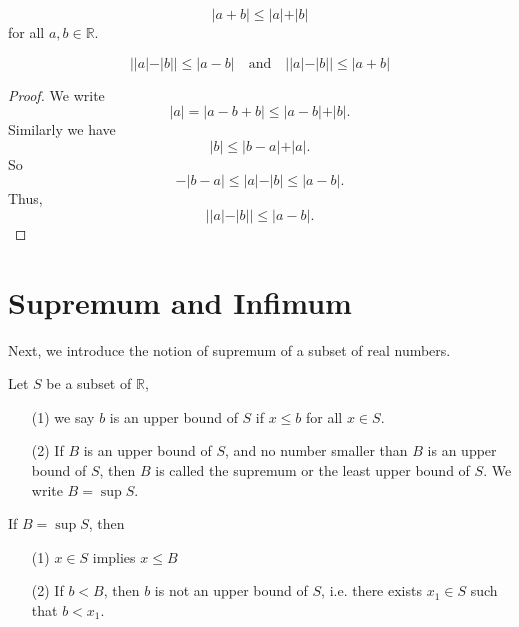 \begin{theorem}
  \[
    \vert a+b \vert \le \vert a \vert + \vert b \vert   
  \] for all \(a,b \in \mathbb{R} \). 
\end{theorem}

\begin{corollary}
  \[
    \left\vert \vert a \vert - \vert b \vert   \right\vert \le \vert a-b \vert \quad \text{and} \quad \left\vert \vert a \vert - \vert b \vert   \right\vert \le \vert a+b \vert 
  \]
\end{corollary}
\begin{proof}
  We write
  \[
    \vert a \vert = \vert a-b+b \vert \le \vert a-b \vert + \vert b \vert.    
  \]
  Similarly we have 
  \[
    \vert b \vert \le \left\vert b-a \right\vert + \vert a \vert.   
  \]
  So 
  \[
    - \vert b-a \vert \le \vert a \vert - \vert b \vert \le \vert a-b \vert.   
  \]
  Thus, 
  \[
    \left\vert \vert a \vert - \vert b \vert   \right\vert \le \vert a-b \vert.
  \]
\end{proof}

\section{Supremum and Infimum}
Next, we introduce the notion of supremum of a subset of real numbers. 
\begin{definition}
  Let \(S\) be a subset of \(\mathbb{R} \), 
  \begin{itemize}
    \item [(1)] we say \(b\) is an upper bound of \(S\) if \(x \le b\) for all \(x \in S\). 
    \item [(2)] If \(B\) is an upper bound of \(S\), and no number smaller than \(B\) is an upper bound of \(S\), then \(B\) is called the supremum or the least upper bound of \(S\). We write \(B = \sup S\).          
  \end{itemize}  
\end{definition}

\begin{corollary}
  If \(B = \sup S\), then 
  \begin{itemize}
    \item [(1)] \(x \in S\) implies \(x \le B\)
    \item [(2)] If \(b < B\), then \(b\) is not an upper bound of \(S\), i.e. there exists \(x_1 \in S\) such that \(b < x_1\).       
  \end{itemize} 
\end{corollary}

